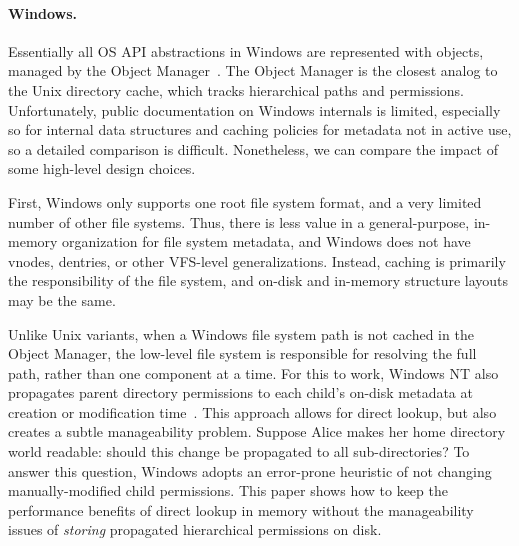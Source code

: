 \paragraph{Windows.}  Essentially all OS API abstractions in Windows are represented 
with objects, managed by the Object Manager~\citep{windowsinternals}.
The Object Manager is the closest analog to the Unix directory cache,
which tracks hierarchical paths and permissions.
Unfortunately, public documentation on Windows internals
is limited, especially so for internal data structures 
and caching policies for metadata not in active use,
so a detailed comparison is difficult.  Nonetheless, we can compare the impact of some high-level design choices.

First, Windows only supports one root file system format, and a very limited 
number of other file systems.
Thus, there is less value in a general-purpose, in-memory organization for file system metadata,
and Windows does not have vnodes, dentries, or other VFS-level generalizations.
Instead, caching is primarily the responsibility of the file system,
and on-disk and in-memory structure layouts may be the same.

Unlike Unix variants, when a Windows file system path is not cached in the Object Manager,
the low-level file system is responsible for resolving the full path, rather than one component 
at a time.
For this to work, Windows NT
also propagates parent directory permissions
to each child's on-disk metadata at creation or modification time~\citep{swift01winnt}.
This approach allows for direct lookup, but also creates a subtle manageability problem.
Suppose Alice makes her home directory 
world readable: should this change be propagated to all sub-directories?
To answer this question, Windows adopts an error-prone heuristic 
of not changing manually-modified child permissions.
This paper shows how to keep the performance benefits of direct lookup in memory
without the manageability issues of {\em storing} propagated hierarchical permissions on disk.


